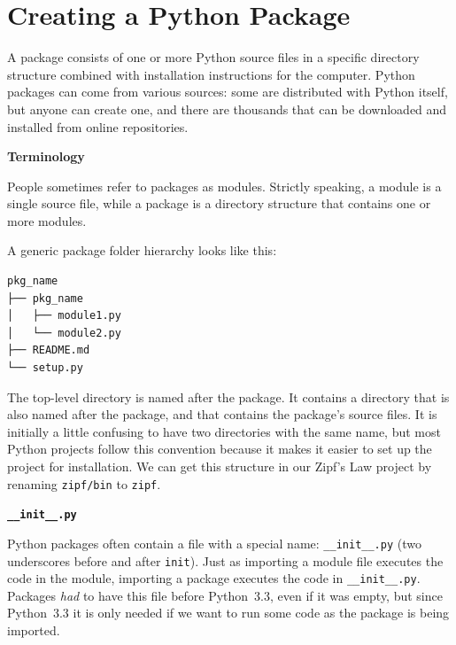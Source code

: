 \documentclass[
]{krantz}
\renewenvironment{quote}{\begin{VF}}{\end{VF}}
\begin{document}
\hypertarget{packaging-package}{%
\section{Creating a Python Package}\label{packaging-package}}

A package consists of one or more Python source files
in a specific directory structure
combined with installation instructions for the computer.
Python packages can come from various sources:
some are distributed with Python itself,
but anyone can create one,
and there are thousands that can be downloaded and installed from online repositories.

\begin{quote}
\textbf{Terminology}

People sometimes refer to packages as modules.
Strictly speaking,
a module is a single source file,
while a package is a directory structure that contains one or more modules.
\end{quote}

A generic package folder hierarchy looks like this:

\begin{verbatim}
pkg_name
├── pkg_name
│   ├── module1.py
│   └── module2.py
├── README.md
└── setup.py
\end{verbatim}

The top-level directory is named after the package.
It contains a directory that is also named after the package,
and that contains the package's source files.
It is initially a little confusing to have two directories with the same name,
but most Python projects follow this convention because
it makes it easier to set up the project for installation.
We can get this structure in our Zipf's Law project
by renaming \texttt{zipf/bin} to \texttt{zipf}.

\begin{quote}
\textbf{\texttt{\_\_init\_\_.py}}

Python packages often contain a file with a special name:
\texttt{\_\_init\_\_.py}
(two underscores before and after \texttt{init}).
Just as importing a module file executes the code in the module,
importing a package executes the code in \texttt{\_\_init\_\_.py}.
Packages \emph{had} to have this file before Python~3.3,
even if it was empty,
but since Python~3.3 it is only needed
if we want to run some code as the package is being imported.
\end{quote}
\end{document}
